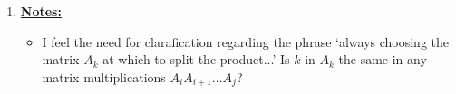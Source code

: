 \documentclass[12pt]{article}
\begin{document}
\begin{enumerate}[1.]
    \item

    \bigskip

    \underline{\textbf{Notes:}}

    \bigskip

    \begin{itemize}
        \item I feel the need for clarafication regarding the phrase `always choosing the matrix $A_k$ at which to split the product...'
        Is $k$ in $A_k$ the same in any matrix multiplications $A_iA_{i+1}...A_j$?
    \end{itemize}
\end{enumerate}
\end{document}
